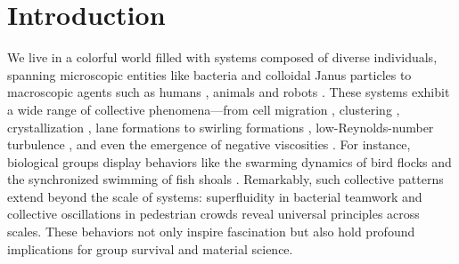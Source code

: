 \documentclass[a4paper, amsfonts, amssymb, amsmath, reprint, showkeys, showpacs, nofootinbib, twoside]{revtex4-2}
\begin{document}
\section{\label{sec:introduction}Introduction}

We live in a colorful world filled with systems composed of diverse individuals, spanning microscopic entities like bacteria \cite{Marchetti2015,PhysRevLett.104.178103} and colloidal Janus particles \cite{B718131K,doi:10.1021/cr300089t,Campbell2019,doi:10.1021/acs.accounts.8b00243} to macroscopic agents such as humans \cite{Majumdar_Pinsard_Nicolas_2020,PhysRevE.51.4282,Gu2025}, animals \cite{doi:10.1073/pnas.0711437105,Becker2015,doi:10.1073/pnas.1118633109,Qiu2015} and robots \cite{PhysRevLett.132.118301,PhysRevE.101.022603,Yangkai88703}. These systems exhibit a wide range of collective phenomena—from cell migration \cite{doi:10.1126/science.1209042,PhysRevLett.122.248102}, clustering \cite{PhysRevLett.110.238301,Ishimoto2018,C5SM01061F,Jinghan70501}, crystallization \cite{doi:10.1126/sciadv.aat7779,PhysRevE.97.052615}, lane formations \cite{PhysRevE.94.052603,Kogler_2015,C0SM01343A} to swirling formations \cite{PhysRevLett.100.058001,riedel2005self,PhysRevLett.93.098103,Daming60702}, low-Reynolds-number turbulence \cite{doi:10.1073/pnas.1710188114,PhysRevE.97.022613,PhysRevE.98.022603}, and even the emergence of negative viscosities \cite{annurev-fluid-010816-060049}. For instance, biological groups display behaviors like the swarming dynamics of bird flocks \cite{PhysRevLett.75.1226,doi:10.1073/pnas.1118633109,Qiu2015,PhysRevLett.119.058002} and the synchronized swimming of fish shoals \cite{doi:10.1073/pnas.0711437105,Becker2015}. Remarkably, such collective patterns extend beyond the scale of systems: superfluidity in bacterial teamwork \cite{Marchetti2015,PhysRevLett.104.178103} and collective oscillations in pedestrian crowds \cite{Majumdar_Pinsard_Nicolas_2020,PhysRevE.51.4282,Gu2025} reveal universal principles across scales. These behaviors not only inspire fascination but also hold profound implications for group survival and material science.
\end{document}
